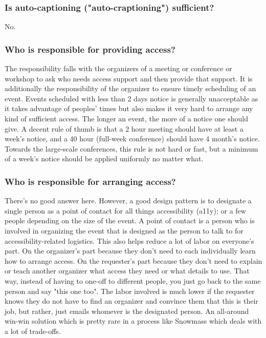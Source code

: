 \documentclass{article}
\begin{document}
  \subsubsection{Is auto-captioning ("auto-craptioning") sufficient?}

  No.~\cite{AudioAccessibility, TheAtlantic, DCMP, ReelWords, A11yNYC, Wired, AngryDeafPeople}

  \subsubsection{Who is responsible for providing access?}

  The responsibility falls with the organizers of a meeting or conference or workshop to ask who needs access support and then provide that support. It is additionally the responsibility of the organizer to ensure timely scheduling of an event. Events scheduled with less than 2 days notice is generally unacceptable as it takes advantage of peoples' times but also makes it very hard to arrange any kind of sufficient access. The longer an event, the more of a notice one should give. A decent rule of thumb is that a 2 hour meeting should have at least a week's notice, and a 40 hour (full-week conference) should have 4 month's notice. Towards the large-scale conferences, this rule is not hard or fast, but a minimum of a week's notice should be applied uniformly no matter what.

  \subsubsection{Who is responsible for arranging access?}

  There's no good answer here. However, a good design pattern is to designate a single person as a point of contact for all things accessibility (a11y); or a few people depending on the size of the event. A point of contact is a person who is involved in organizing the event that is designed as the person to talk to for accessibility-related logistics. This also helps reduce a lot of labor on everyone's part. On the organizer's part because they don't need to each individually learn how to arrange access. On the requester's part because they don't need to explain or teach another organizer what access they need or what details to use. That way, instead of having to one-off to different people, you just go back to the same person and say "this one too". The labor involved is much lower if the requester knows they do not have to find an organizer and convince them that this is their job, but rather, just emails whomever is the designated person. An all-around win-win solution which is pretty rare in a process like Snowmass which deals with a lot of trade-offs.
\end{document}
